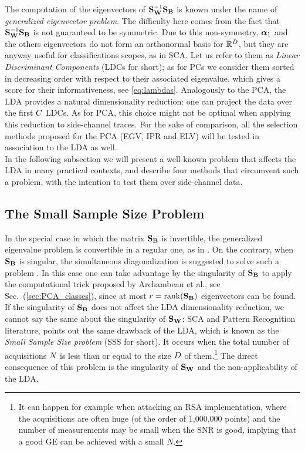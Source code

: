 The computation of the eigenvectors of $\SW^{-1} \SB$ is known under the name of {\em generalized eigenvector problem}. The difficulty here comes from the fact that $\SW^{-1} \SB$ is not guaranteed to be symmetric. Due to this non-symmetry,  $\AAlpha_1$ and the others eigenvectors do not form an orthonormal basis for $\mathbb{R}^\traceLength$, but they are anyway useful for classifications scopes, as in SCA. Let us refer to them as {\em Linear Discriminant Components} (LDCs for short); as for PCs we consider them sorted in decreasing order with respect to their associated eigenvalue, which gives a score for their informativeness, see \eqref{eq:lambdas}. Analogously to the PCA, the LDA provides a natural dimensionality reduction: one can project the data over the first $\newTraceLength$ LDCs. As for PCA, this choice might not be optimal when applying this reduction to side-channel traces. For the sake of comparison, all the selection methods proposed for the PCA (EGV, IPR and ELV) will be tested in association to the LDA as well.\\

In the following subsection we will present a well-known problem that affects the LDA in many practical contexts, and describe four methods that circumvent such a problem, with the intention to test them over side-channel data.



\subsection{The Small Sample Size Problem}\label{sec:SSS}
In the special case in which the matrix $\SB$ is invertible, the generalized eigenvalue problem is convertible in a regular one, as in \cite{Standaert2008}. On the contrary, when $\SB$ is singular, the simultaneous diagonalization is suggested to solve such a problem \cite{Fukunaga}. In this case one can take advantage by the singularity of $\SB$ to apply the computational trick proposed by Archambeau et al., see Sec.~(\ref{sec:PCA_classes}), since at most $r = \mathrm{rank}(\SB)$ eigenvectors can be found.\\

If the singularity of $\SB$ does not affect the LDA dimensionality reduction, we cannot say the same about the singularity of $\SW$:  SCA and Pattern Recognition literature, points out the same drawback of the LDA, which is known as the {\em Small Sample Size problem} (SSS for short). It occurs when the total number of acquisitions $\numTraces[]$ is less than or equal to the size $\traceLength$ of them.\footnote{It can happen for example when attacking an RSA implementation, where the acquisitions are often huge (of the order of 1,000,000 points) and the number of measurements may be small when the SNR is good, implying that a good GE can be achieved with a small $N$.} The direct consequence of this problem is the singularity of $\SW$ and the non-applicability of the LDA. \\

